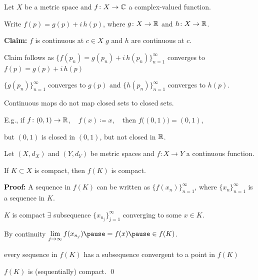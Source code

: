 \documentclass[10pt,aspectratio=169]{beamer}
\begin{document}
\begin{frame}

Let $X$ be a metric space and $f \colon X \to {\mathbb{C}}$ a complex-valued function.

\pause
\medskip

Write $f(p) = g(p) + i \, h(p)$, where $g \colon X \to {\mathbb{R}}$ and $h \colon X \to {\mathbb{R}}$.


\pause
\medskip

\textbf{Claim:}
$f$ is continuous at $c \in X$ \wiffif $g$ and $h$ are continuous at $c$.

\pause
\medskip

Claim follows as $\bigl\{ f(p_n) = g(p_n) + i \,h(p_n) \bigr\}_{n=1}^\infty$
converges to $f(p) = g(p) + i \, h(p)$

\pause
\iffif \quad
$\bigl\{ g(p_n) \bigr\}_{n=1}^\infty$ converges to $g(p)$
\pause
and
$\bigl\{ h(p_n) \bigr\}_{n=1}^\infty$ converges to $h(p)$.

\end{frame}

\begin{frame}

Continuous maps do not map closed sets to closed sets.

\pause
E.g., if $f \colon (0,1) \to {\mathbb{R}}$, ~ $f(x) \coloneqq x$, ~ then
$f\bigl((0,1)\bigr) = (0,1)$,

\pause
but $(0,1)$ is closed in $(0,1)$, but not closed in ${\mathbb{R}}$.

\pause

\begin{lemma}
Let $(X,d_X)$ and $(Y,d_Y)$ be metric spaces
and $f \colon X \to Y$ a continuous function.

\pause
If $K \subset X$ is compact, then $f(K)$ is compact.
\end{lemma}

\pause
\textbf{Proof:}
A sequence in $f(K)$ can be written as
$\bigl\{ f(x_n) \bigr\}_{n=1}^\infty$, where
$\{ x_n \}_{n=1}^\infty$ is a sequence in $K$.

\pause
\medskip

$K$ is compact \wthus $\exists$
subsequence
$\{ x_{n_j} \}_{j=1}^\infty$ converging to some $x \in K$.

\pause
\medskip

By continuity
$\displaystyle
\lim_{j\to\infty} f(x_{n_j})
\pause
= f(x)
\pause
\in f(K)$.

\pause
\medskip

\thus \quad every sequence in $f(K)$ has a subsequence convergent to 
a point in $f(K)$

\pause
\thus \quad $f(K)$ is (sequentially) compact.
\qed

\end{frame}
\end{document}
